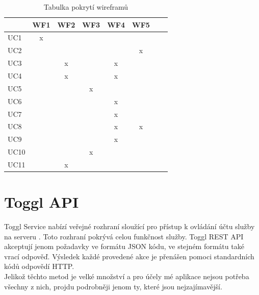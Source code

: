 \documentclass[thesis=B,czech]{FITthesis}[2012/06/26]
\begin{document}
\begin{table}[t] \centering
	
	\begin{tabular}{|l||c|c|c|c|c|c|c|}
		\hline
		& WF1 & WF2 & WF3 & WF4 & WF5\\ \hline \hline
		UC1  & x & & & &  \\ \hline
		UC2  & & & & & x \\ \hline
		UC3  & & x & & x &  \\ \hline
		UC4  & & x & & x &   \\ \hline
		UC5  & & & x & &  \\ \hline
		UC6  & &  & & x &  \\ \hline
		UC7  & & & & x &    \\ \hline
		UC8  & & &  & x & x \\ \hline
		UC9  & & & & x &    \\ \hline
		UC10  & & & x & &    \\ \hline
		UC11  & & x & & &    \\ \hline
		
	\end{tabular}
	\caption[Tabulka pokrytí wireframů]{Tabulka pokrytí wireframů}\label{tab:coverUCWF}
\end{table}

\section{Toggl API}
	Toggl Service nabízí veřejné rozhraní sloužící pro přístup k ovládání účtu služby na serveru \cite{toggl_api}. Toto rozhraní pokrývá celou funkčnost služby. Toggl REST API akceptují jenom požadavky ve formátu JSON kódu, ve stejném formátu také vrací odpověď. Výsledek každé provedené akce je přenášen  pomoci standardních kódů odpovědí HTTP.\\	
	Jelikož těchto metod je velké množství a pro účely mé aplikace nejsou potřeba všechny z nich, projdu podrobněji jenom ty, které jsou nejzajímavější. 
	
\end{document}
